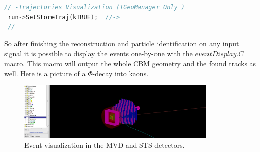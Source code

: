 \documentclass[a4paper,12pt]{article}
\begin{document}
\begin{lstlisting}[language=C++]
 // -Trajectories Visualization (TGeoManager Only )
 run->SetStoreTraj(kTRUE);  //->
 // -----------------------------------------------
\end{lstlisting}
\par So after finishing the reconstruction and particle identification on any input signal it is possible to display the
 events one-by-one with the $eventDisplay.C$ macro. This macro will output the whole CBM geometry and the found tracks
  as well. Here is a picture of a $\Phi$-decay into kaons.
\begin{figure}[H]
	\centering
	\includegraphics[width=0.85\textwidth]{k-k+decayofphi.png}
	\caption{ Event visualization in the MVD and STS detectors. }
\end{figure}
\end{document}
